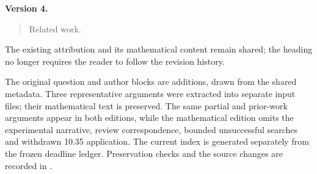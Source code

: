 \noindent\textbf{Version 4.}\begin{quote}\small
Related work.
\end{quote}

The existing attribution and its mathematical content remain shared; the heading no longer requires the reader to follow the revision history.

The original question and author blocks are additions, drawn from the
shared metadata. Three representative arguments were extracted into
separate input files; their mathematical text is preserved. The same
partial and prior-work arguments appear in both editions, while the
mathematical edition omits the experimental narrative, review correspondence,
bounded unsuccessful searches and withdrawn 10.35 application. The current
index is generated separately from the frozen deadline ledger. Preservation
checks and the source changes are recorded in
.
